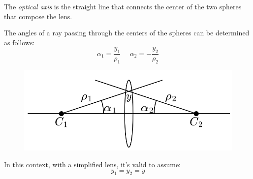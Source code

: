 \begin{definition}
    The \emph{optical axis} is the straight line that connects the center of the two spheres that compose the lens.
\end{definition}
The angles of a ray passing through the centers of the spheres can be determined as follows:
\[\alpha_1=\dfrac{y_1}{\rho_1} \:\:\:\:\:\: \alpha_2=-\dfrac{y_2}{\rho_2}\]
\begin{figure}[H]
    \centering
    \includegraphics[width=0.4\linewidth]{images/y.png}
\end{figure}
In this context, with a simplified lens, it's valid to assume:
\[y_1=y_2=y\]